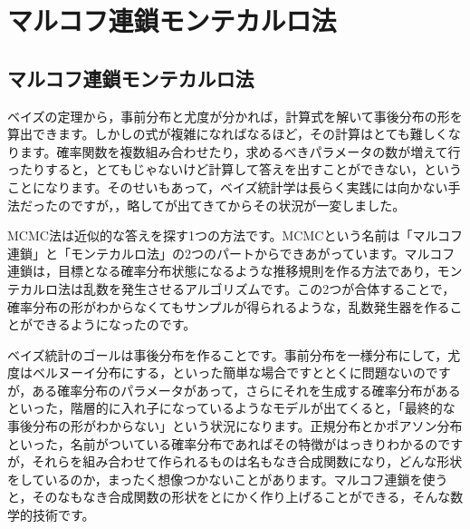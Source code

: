 \documentclass{ltjsbook}
\begin{document}
\chapter{マルコフ連鎖モンテカルロ法}
\label{H14_MCMC}

\section{マルコフ連鎖モンテカルロ法}
\label{MCMC}
ベイズの定理から，事前分布と尤度が分かれば，計算式を解いて事後分布の形を算出できます。しかしの式が複雑になればなるほど，その計算はとても難しくなります。確率関数を複数組み合わせたり，求めるべきパラメータの数が増えて行ったりすると，とてもじゃないけど計算して答えを出すことができない，ということになります。そのせいもあって，ベイズ統計学は長らく実践には向かない手法だったのですが，，略してが出てきてからその状況が一変しました。

MCMC法は近似的な答えを探す1つの方法です。MCMCという名前は「マルコフ連鎖」と「モンテカルロ法」の2つのパートからできあがっています。マルコフ連鎖は，目標となる確率分布状態になるような推移規則を作る方法であり，モンテカルロ法は乱数を発生させるアルゴリズムです。この2つが合体することで，確率分布の形がわからなくてもサンプルが得られるような，乱数発生器を作ることができるようになったのです。

ベイズ統計のゴールは事後分布を作ることです。事前分布を一様分布にして，尤度はベルヌーイ分布にする，といった簡単な場合ですととくに問題ないのですが，ある確率分布のパラメータがあって，さらにそれを生成する確率分布があるといった，階層的に入れ子になっているようなモデルが出てくると，「最終的な事後分布の形がわからない」という状況になります。正規分布とかポアソン分布といった，名前がついている確率分布であればその特徴がはっきりわかるのですが，それらを組み合わせて作られるものは名もなき合成関数になり，どんな形状をしているのか，まったく想像つかないことがあります。マルコフ連鎖を使うと，そのなもなき合成関数の形状をとにかく作り上げることができる，そんな数学的技術です。
\end{document}
